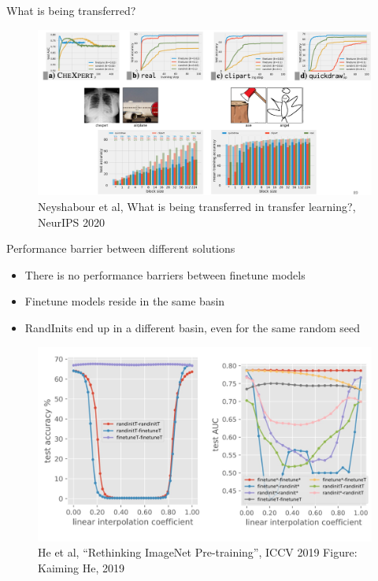 \documentclass[serif, aspectratio=169]{beamer}
\begin{document}
\begin{frame}{What is being transferred?}
	\begin{figure}[htpb]
		\begin{center}
			\includegraphics[keepaspectratio, scale=0.15]{pic/what_TL}
			\caption*{\scriptsize Neyshabour et al, What is being transferred in transfer learning?, NeurIPS 2020}
		\end{center}
	\end{figure}
\end{frame}

\begin{frame}{Performance barrier between different solutions}
	\begin{itemize}
		\item There is no performance barriers between finetune models
		\item Finetune models reside in the same basin
		\item RandInits end up in a different basin, even for the same random seed
	\end{itemize}
	
	\begin{figure}
		\includegraphics[keepaspectratio, scale=0.22]{pic/what_TL2}
		\vspace{-1em}
		\caption*{\scriptsize He et al, “Rethinking ImageNet Pre-training”, ICCV 2019 Figure: Kaiming He, 2019}
	\end{figure}
\end{frame}
\end{document}
